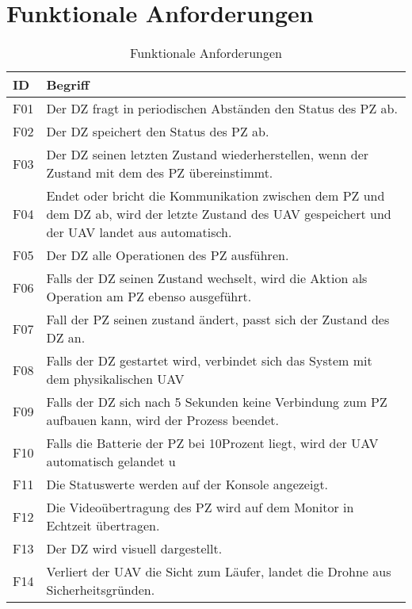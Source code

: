 \section{Funktionale Anforderungen}

\begin{table}[h]
\begin{tabular}{ l p{12cm}}
    ID & Begriff  \\
    \hline
    F01 & Der DZ fragt in periodischen Abständen den Status des PZ ab. \\
    F02 & Der DZ speichert den Status des PZ ab. \\
    F03 & Der DZ seinen letzten Zustand wiederherstellen, wenn der Zustand mit dem des PZ übereinstimmt. \\
    F04 & Endet oder bricht die Kommunikation zwischen dem PZ und dem DZ ab, wird der letzte Zustand des UAV gespeichert und der UAV landet aus automatisch. \\
    F05 & Der DZ alle Operationen des PZ ausführen. \\
    F06 & Falls der DZ seinen Zustand wechselt, wird die Aktion als Operation am PZ ebenso ausgeführt. \\
    F07 & Fall der PZ seinen zustand ändert, passt sich der Zustand des DZ an. \\
    F08 & Falls der DZ gestartet wird, verbindet sich das System mit dem physikalischen UAV \\
    F09 & Falls der DZ sich nach 5 Sekunden keine Verbindung zum PZ aufbauen kann, wird der Prozess beendet. \\
    F10 & Falls die Batterie der PZ bei 10Prozent liegt, wird der UAV automatisch gelandet u \\
    F11 & Die Statuswerte werden auf der Konsole angezeigt. \\
    F12 & Die Videoübertragung des PZ wird auf dem Monitor in Echtzeit übertragen. \\
    F13 & Der DZ wird visuell dargestellt. \\
    F14 & Verliert der UAV die Sicht zum Läufer, landet die Drohne aus Sicherheitsgründen. \\    
\end{tabular}
\caption{Funktionale Anforderungen}\label{table:Funktionale Anforderungen}

\end{table}